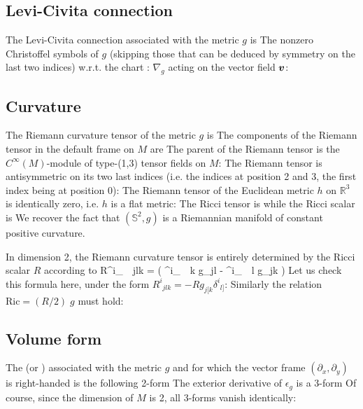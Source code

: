 \subsection{Levi-Civita connection}

The Levi-Civita connection associated with the metric $g$ is
The nonzero Christoffel symbols of $g$ (skipping those that can be deduced by symmetry on the last two indices) w.r.t. the chart :
$\nabla_g$ acting on the vector field $\bm{v}$:

\subsection{Curvature}

The Riemann curvature tensor of the metric $g$ is
The components of the Riemann tensor in the default frame on $M$ are
The parent of the Riemann tensor is the $C^\infty(M)$-module of
type-(1,3) tensor fields on $M$:
The Riemann tensor is antisymmetric on its two last indices (i.e. the indices
at position 2 and 3, the first index being at position 0):
The Riemann tensor of the Euclidean metric $h$ on $\mathbb{R}^3$ is identically zero,
i.e. $h$ is a flat metric:
The Ricci tensor is
while the Ricci scalar is
We recover the fact that $(\mathbb{S}^2,g)$ is a Riemannian manifold of constant positive curvature.

In dimension 2, the Riemann curvature tensor is entirely determined by the Ricci scalar $R$ according to
\be
 R^i_{\ \, jlk} =  \left( \delta^i_{\ \, k} g_{jl} - \delta^i_{\ \, l} g_{jk} \right)
\ee
Let us check this formula here, under the form
$R^i_{\ \, jlk} = -R g_{j[k} \delta^i_{\ \, l]}$:
Similarly the relation $\mathrm{Ric} = (R/2)\; g$ must hold:

\subsection{Volume form}

The  (or ) associated with the
metric $g$ and for which the vector frame $(\partial_x,\partial_y)$ is
right-handed is the following 2-form
The exterior derivative of $\epsilon_g$ is a 3-form
Of course, since the dimension of $M$ is 2, all 3-forms vanish identically:











